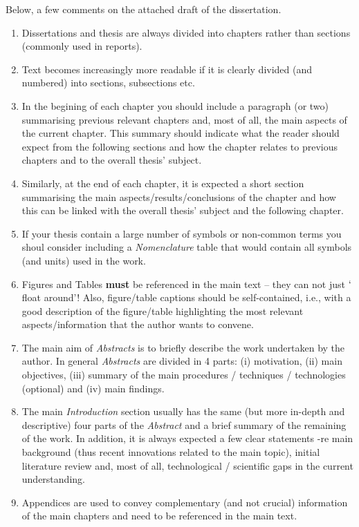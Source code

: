 \documentclass[14pt,twoside]{report}
\begin{document}
\noindent
Below, a few comments on the attached draft of the dissertation. 
\begin{enumerate}
%
\item Dissertations and thesis are always divided into chapters rather than sections (commonly used in reports). 
%
\item Text becomes increasingly more readable if it is clearly divided (and numbered) into sections, subsections etc.  
%
\item In the begining of each chapter you should include a paragraph (or two) summarising previous relevant chapters and, most of all, the main aspects of the current chapter. This summary should indicate what the reader should expect from the following sections and how the chapter relates to previous chapters and to the overall thesis' subject.
%
\item Similarly, at the end of each chapter, it is expected a short section summarising the main aspects/results/conclusions of the chapter and how this can be linked with the overall thesis' subject and the following chapter.
%
\item If your thesis contain a large number of symbols or non-common terms you shoul consider including a {\it Nomenclature} table that would contain all symbols (and units) used in the work. 
%
\item Figures and Tables {\bf must} be referenced in the main text -- they can not just $\lq$float around'! Also, figure/table captions should be self-contained, i.e., with a good description of the figure/table highlighting the most relevant aspects/information that the author wants to convene. 
%
\item The main aim of {\it Abstracts} is to briefly describe the work undertaken by the author. In general {\it Abstracts} are divided in 4 parts: (i) motivation, (ii) main objectives, (iii) summary of the main procedures / techniques / technologies (optional) and (iv) main findings. 
%
\item The main {\it Introduction} section usually has the same (but more in-depth and descriptive) four parts of the {\it Abstract} and a brief summary of the remaining of the work. In addition, it is always expected a few clear statements -re main background (thus recent innovations related to the main topic), initial literature review and, most of all, technological / scientific gaps in the current understanding. 
%
\item Appendices are used to convey complementary (and not crucial) information of the main chapters and need to be referenced in the main text.

\end{enumerate}
\end{document}
